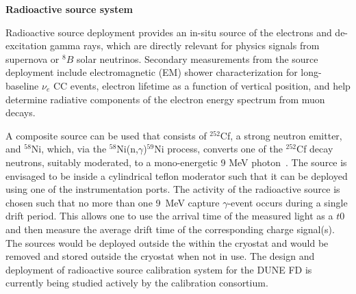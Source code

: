 \textbf{Radioactive source system}

Radioactive source deployment provides an in-situ source of the electrons and de-excitation gamma rays, which are directly relevant for physics signals from supernova or $^{8}B$ solar neutrinos. Secondary measurements from the source deployment include electromagnetic (EM) shower characterization for long-baseline $\nu_e$ CC events, electron lifetime as a function of  vertical position, and help determine radiative components of the electron energy spectrum from muon decays.

A composite source can be used that consists of $^{252}$Cf, a strong neutron emitter, and $^{58}$Ni, which, via the $^{58}$Ni(n,$\gamma$)$^{59}$Ni process, converts one of the $^{252}$Cf decay neutrons, suitably moderated, to a mono-energetic 9 MeV photon~\cite{Rogers:1996ks}. The source is envisaged to be inside a cylindrical teflon moderator such that it can be deployed using one of the instrumentation ports. The activity of the radioactive source is chosen such that no more than one \SI{9}{\MeV} capture $\gamma$-event occurs during a single drift period. This allows one to use the arrival time of the measured light as a $t0$ and then measure the average drift time of the corresponding charge signal(s). The sources would be deployed outside the  within the cryostat and would be removed and stored outside the cryostat when not in use. The design and deployment of radioactive source calibration system for the DUNE FD is currently being studied actively by the calibration consortium. 



